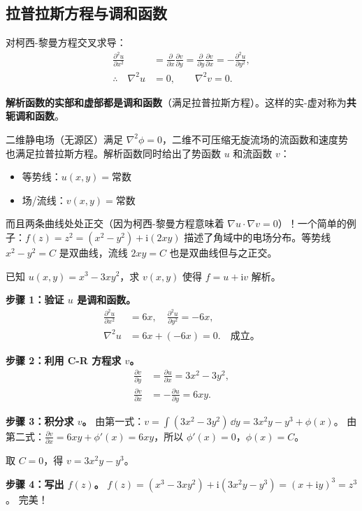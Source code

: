 \subsection{拉普拉斯方程与调和函数}

对柯西-黎曼方程交叉求导：
\begin{align}
\frac{\partial^2 u}{\partial x^2} &= \frac{\partial}{\partial x}\frac{\partial v}{\partial y}
= \frac{\partial}{\partial y}\frac{\partial v}{\partial x}
= -\frac{\partial^2 u}{\partial y^2},\\
\therefore\quad \nabla^2 u &= 0,\qquad \nabla^2 v = 0.
\end{align}

\textbf{解析函数的实部和虚部都是调和函数}（满足拉普拉斯方程）。这样的实-虚对称为\textbf{共轭调和函数}。

\begin{insight}[二维物理场的天然语言]
二维静电场（无源区）满足 $\nabla^2\phi = 0$，二维不可压缩无旋流场的流函数和速度势也满足拉普拉斯方程。解析函数同时给出了势函数 $u$ 和流函数 $v$：
\begin{itemize}
\item 等势线：$u(x,y) = \text{常数}$
\item 场/流线：$v(x,y) = \text{常数}$
\end{itemize}
而且两条曲线处处正交（因为柯西-黎曼方程意味着 $\nabla u\cdot\nabla v = 0$）！一个简单的例子：$f(z) = z^2 = (x^2-y^2) + \mathrm{i}(2xy)$ 描述了角域中的电场分布。等势线 $x^2-y^2=C$ 是双曲线，流线 $2xy=C$ 也是双曲线但与之正交。
\end{insight}

\begin{example}[由实部求解析函数]
已知 $u(x,y) = x^3 - 3xy^2$，求 $v(x,y)$ 使得 $f=u+\mathrm{i}v$ 解析。

\textbf{步骤 1：验证 $u$ 是调和函数。}
\begin{align*}
\frac{\partial^2 u}{\partial x^2} &= 6x,\quad
\frac{\partial^2 u}{\partial y^2} = -6x,\\
\nabla^2 u &= 6x + (-6x) = 0. \quad\text{成立。}
\end{align*}

\textbf{步骤 2：利用 C-R 方程求 $v$。}
\begin{align*}
\frac{\partial v}{\partial y} &= \frac{\partial u}{\partial x} = 3x^2 - 3y^2,\\
\frac{\partial v}{\partial x} &= -\frac{\partial u}{\partial y} = 6xy.
\end{align*}

\textbf{步骤 3：积分求 $v$。}
由第一式：$v = \int (3x^2 - 3y^2)\,\dd y = 3x^2 y - y^3 + \phi(x)$。
由第二式：$\frac{\partial v}{\partial x} = 6xy + \phi'(x) = 6xy$，所以 $\phi'(x)=0$，$\phi(x)=C$。

取 $C=0$，得 $v = 3x^2 y - y^3$。

\textbf{步骤 4：写出 $f(z)$。}
$f(z) = (x^3-3xy^2) + \mathrm{i}(3x^2y - y^3) = (x+\mathrm{i}y)^3 = z^3$。
完美！
\end{example}


